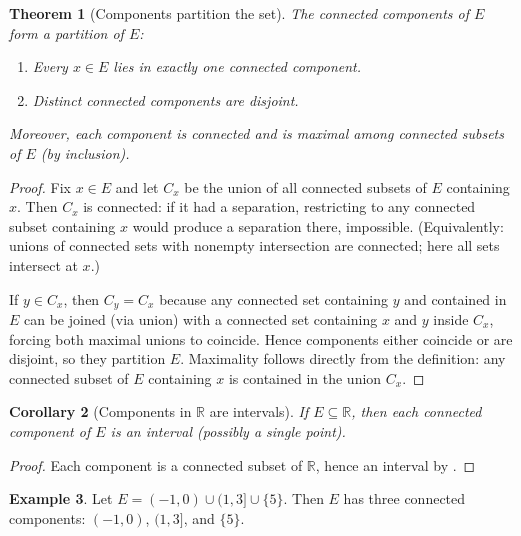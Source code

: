 \documentclass[12pt]{article}
\numberwithin{equation}{section}
\newcommand{\RR}{\mathbb{R}}
\theoremstyle{plain}
\newtheorem{theorem}{Theorem}[section]
\newtheorem{corollary}[theorem]{Corollary}
\theoremstyle{definition}
\newtheorem{example}[theorem]{Example}
\theoremstyle{remark}
\begin{document}
\begin{theorem}[Components partition the set]\label{thm:components-partition}
The connected components of $E$ form a partition of $E$:
\begin{enumerate}[label=(\alph*)]
\item Every $x\in E$ lies in exactly one connected component.
\item Distinct connected components are disjoint.
\end{enumerate}
Moreover, each component is connected and is maximal among connected subsets of $E$ (by inclusion).
\end{theorem}

\begin{proof}
Fix $x\in E$ and let $C_x$ be the union of all connected subsets of $E$ containing $x$.
Then $C_x$ is connected: if it had a separation, restricting to any connected subset containing $x$ would produce a separation there, impossible.
(Equivalently: unions of connected sets with nonempty intersection are connected; here all sets intersect at $x$.)

If $y\in C_x$, then $C_y=C_x$ because any connected set containing $y$ and contained in $E$ can be joined (via union) with a connected set containing $x$ and $y$ inside $C_x$,
forcing both maximal unions to coincide. Hence components either coincide or are disjoint, so they partition $E$.
Maximality follows directly from the definition: any connected subset of $E$ containing $x$ is contained in the union $C_x$.
\end{proof}

\begin{corollary}[Components in $\RR$ are intervals]\label{cor:components-intervals}
If $E\subseteq\RR$, then each connected component of $E$ is an interval (possibly a single point).
\end{corollary}

\begin{proof}
Each component is a connected subset of $\RR$, hence an interval by .
\end{proof}

\begin{example}
Let $E=(-1,0)\cup(1,3]\cup\{5\}$.
Then $E$ has three connected components: $(-1,0)$, $(1,3]$, and $\{5\}$.
\end{example}
\end{document}
